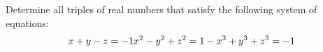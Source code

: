 Determine all triples of real numbers that satisfy the following system of equations:\[x+y-z=-1\\ x^2-y^2+z^2=1\\ -x^3+y^3+z^3=-1\]